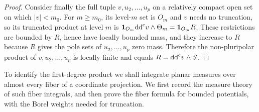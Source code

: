 \begin{proof}
Consider finally the full tuple $v,u_2,\ldots,u_p$ on a relatively compact open set on which $|v|<m_0$. For $m\geq m_0$, its level-$m$ set is $O_m$ and $v$ needs no truncation, so its truncated product at level $m$ is $\mathbf1_{O_m}\mathrm{dd}^{\mathrm{c}} v\wedge\Theta_m=\mathbf1_{O_m}R$. These restrictions are bounded by $R$, hence have locally bounded mass, and they increase to $R$ because $R$ gives the pole sets of $u_2,\ldots,u_p$ zero mass. Therefore the non-pluripolar product of $v,u_2,\ldots,u_p$ is locally finite and equals $R=\mathrm{dd}^{\mathrm{c}} v\wedge S$.
\end{proof}

To identify the first-degree product we shall integrate planar measures over almost every fiber of a coordinate projection. We first record the measure theory of such fiber integrals, and then prove the fiber formula for bounded potentials, with the Borel weights needed for truncation.

